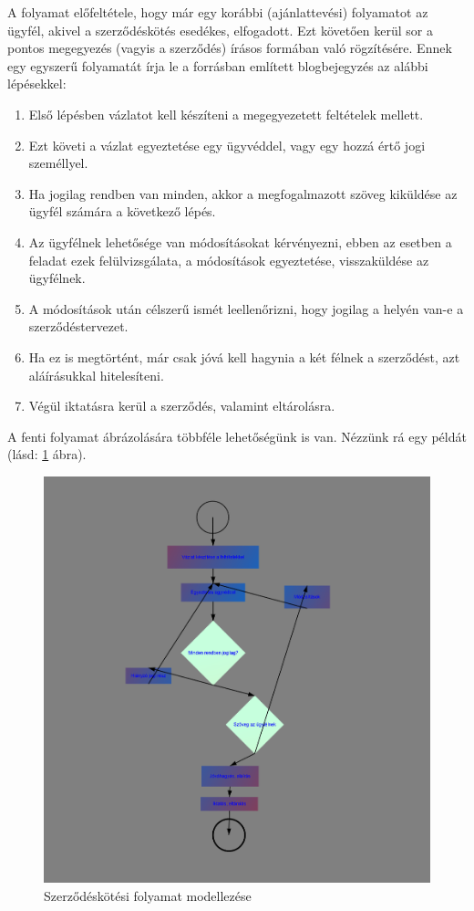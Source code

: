 A folyamat előfeltétele, hogy már egy korábbi (ajánlattevési) folyamatot az ügyfél, akivel a szerződéskötés esedékes, elfogadott. Ezt követően kerül sor a pontos megegyezés (vagyis a szerződés) írásos formában való rögzítésére. Ennek egy egyszerű folyamatát írja le a forrásban említett blogbejegyzés az alábbi lépésekkel:

\begin{enumerate}
\item Első lépésben vázlatot kell készíteni a megegyezetett feltételek mellett.
\item Ezt követi a vázlat egyeztetése egy ügyvéddel, vagy egy hozzá értő jogi személlyel.
\item Ha jogilag rendben van minden, akkor a megfogalmazott szöveg kiküldése az ügyfél számára a következő lépés.
\item Az ügyfélnek lehetősége van módosításokat kérvényezni, ebben az esetben a feladat ezek felülvizsgálata, a módosítások egyeztetése, visszaküldése az ügyfélnek.
\item A módosítások után célszerű ismét leellenőrizni, hogy jogilag a helyén van-e a szerződéstervezet.
\item Ha ez is megtörtént, már csak jóvá kell hagynia a két félnek a szerződést, azt aláírásukkal hitelesíteni.
\item Végül iktatásra kerül a szerződés, valamint eltárolásra.
\end{enumerate}
A fenti folyamat ábrázolására többféle lehetőségünk is van. Nézzünk rá egy példát (lásd: \ref{fig:bpmn2} ábra).

\begin{figure}[h]
\centering
\includegraphics[scale=0.5]{images/pelda2.png}
\caption{Szerződéskötési folyamat modellezése}
\label{fig:bpmn2}
\end{figure}

